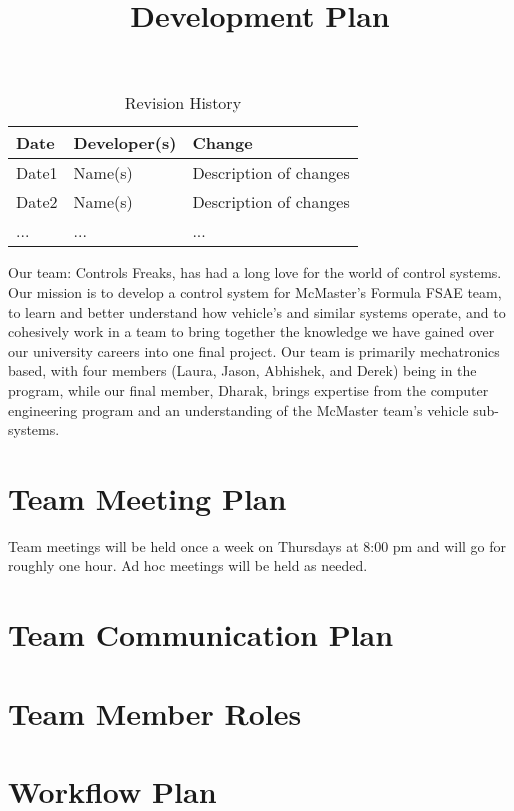 \documentclass{article}
\title{Development Plan\\\progname}
\author{\authname}
\date{}
\begin{document}
\begin{table}[hp]
\caption{Revision History} \label{TblRevisionHistory}
\begin{tabularx}{\textwidth}{llX}
\toprule
\textbf{Date} & \textbf{Developer(s)} & \textbf{Change}\\
\midrule
Date1 & Name(s) & Description of changes\\
Date2 & Name(s) & Description of changes\\
... & ... & ...\\
\bottomrule
\end{tabularx}
\end{table}

\newpage

\maketitle

Our team: Controls Freaks, has had a long love for 
the world of control systems. Our mission is to develop 
a control system for McMaster’s Formula FSAE team, to learn 
and better understand how vehicle’s and similar systems operate, 
and to cohesively work in a team to bring together the knowledge 
we have gained over our university careers into one final project. 
Our team is primarily mechatronics based, with four members 
(Laura, Jason, Abhishek, and Derek) being in the program, while 
our final member, Dharak, brings expertise from the computer engineering 
program and an understanding of the McMaster team's vehicle sub-systems.

\section{Team Meeting Plan}
Team meetings will be held once a week on 
Thursdays at 8:00 pm and will go for roughly 
one hour. Ad hoc meetings will be held as needed.

\section{Team Communication Plan}

\section{Team Member Roles}

\section{Workflow Plan}
\end{document}
